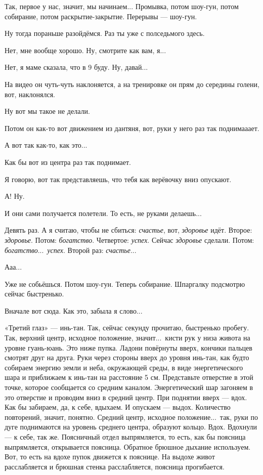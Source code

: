 \I
Так, первое у нас,
значит, мы начинаем... Промывка, потом
шоу-гун, потом собирание, потом раскрытие-закрытие. Перерывы --- шоу-гун.

\M
Ну тогда пораньше разойдёмся. Раз ты уже с полседьмого здесь.

\I
Нет, мне вообще хорошо. Ну, смотрите как вам, я...

\M
Нет, я маме сказала, что в 9 буду. Ну, давай...

\I
На видео он чуть-чуть наклоняется, а на тренировке он прям до середины голени, вот, наклонялся.

\M
Ну вот мы такое
не делали.

\I
Потом он как-то вот движением из дантяня, вот, руки у него {\csc раз} так поднимааает.

\M
А вот так как-то, как это...

\I
Как бы вот из центра {\csc раз} так поднимает.

\M
Я говорю, вот так представляешь, что тебя как верёвочку вниз опускают.

\I
А! Ну.

\M
И они сами получается полетели.
То есть, не руками делаешь...

\I
Девять раз. А я считаю, чтобы
не сбиться: {\it счастье}, вот, {\it здоровье\/} идёт. Второе: {\it здоровье}.
Потом: {\it богатство}. Четвертое:
{\it успех}.
Сейчас {\it здоровье\/} сделали. Потом: {\it богатство}...\
{\it успех}. Второй раз: {\it счастье}...

\M
Ааа...

\I
Уже не собьёшься.
Потом шоу-гун.
Теперь собирание. \hfil\break Шпаргалку подсмотрю сейчас быстренько.

\M
Вначале вот сюда. Как это, забыла я слово...

\I
«Третий глаз» --- инь-тан. Так, сейчас секунду прочитаю, быстренько пробегу.
Так, верхний центр, исходное положение, значит...\ кисти рук у низа
живота на уровне гуань-юань. Это ниже пупка.
Ладони повёрнуты вверх, кончики пальцев смотрят друг на друга.
Руки через стороны вверх до уровня инь-тан, как будто собираем энергию земли и неба,
окружающей среды, в виде энергетического шара и приближаем к инь-тан на расстояние 5 см.
Представьте отверстие в
этой точке, которое сообщается со средним каналом.
Энергетический шар загоняем в это отверстие и проводим вниз в средний центр.
При поднятии вверх --- вдох.
Как бы забираем, да, к себе, вдыхаем. И опускаем --- выдох.
Количество повторений, значит, понятно.
Средний центр, исходное положение...\ так, руки по дуге поднимаются на уровень среднего центра,
образуют кольцо. Вдох. Вдохнули --- к себе, так же.
Поясничный отдел выпрямляется, то есть, как бы поясница выпрямляется, открывается поясница.
Обратное брюшное дыхание используем.
Вот, то есть на вдохе пупок движется к пояснице.
На выдохе живот расслабляется
и брюшная стенка
расслабляется, поясница прогибается.

